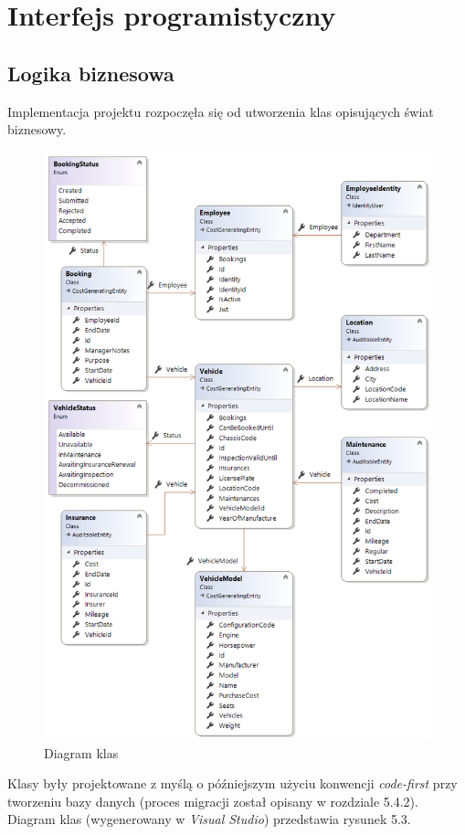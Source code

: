 \documentclass[eng,printmode,openany]{mgr}
\begin{document}
	\newpage
	\section{Interfejs programistyczny}
	\subsection{Logika biznesowa}
	Implementacja projektu rozpoczęła się od utworzenia klas opisujących świat biznesowy.
	\begin{figure}[H]
		\centering
		\includegraphics[scale=0.63]{images/vs_class_diagram.png}
		\caption{Diagram klas}
	\end{figure}
	
	Klasy były projektowane z myślą o późniejszym użyciu konwencji \textit{code-first} przy tworzeniu bazy danych (proces migracji został opisany w rozdziale 5.4.2). Diagram klas (wygenerowany w \textit{Visual Studio}) przedstawia rysunek 5.3.
	
\end{document}
